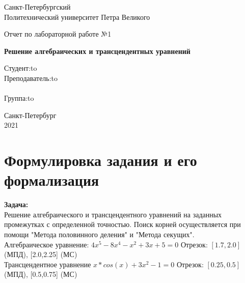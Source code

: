\documentclass[12pt]{article}
\begin{document}
\begin{titlepage}
\Large

\begin{center}
Санкт-Петербургский \\ Политехнический университет Петра Великого

\vspace{10em}

Отчет по лабораторной работе №1\\

\vspace{2em}

\textbf{Решение алгебраических и трансцендентных уравнений}
\end{center}

\vspace{6em}

\newbox{\lbox}
\newlength{\maxl}
\setlength{\maxl}{\wd\lbox}
\hfill\parbox{12cm}{
\hspace*{3cm}\hspace*{-5cm}Студент:\hfill\hbox to\\
\hspace*{3cm}\hspace*{-5cm}Преподаватель:\hfill\hbox to\\
\\
\hspace*{3cm}\hspace*{-5cm}Группа:\hfill\hbox to\\
}

\vspace{\fill}

\begin{center}
Санкт-Петербург \\2021
\end{center}

\end{titlepage}

\section{Формулировка задания и его формализация}
\textbf{Задача:}\\Решение алгебраического и трансцендентного уравнений на заданных промежутках с определенной точностью. Поиск корней осуществляется при помощи "Метода половинного деления" и "Метода секущих".\\
Алгебраическое уравнение: $4x^5-8x^4-x^2+3x+5 = 0$ Отрезок: $[1.7,2.0]$ (МПД), [2.0,2.25] (МС)\\
Трансцендентное уравнение $x*cos(x)+3x^2-1=0$ Отрезок: $[0.25,0.5]$ (МПД), [0.5,0.75] (МС)
\end{document}
